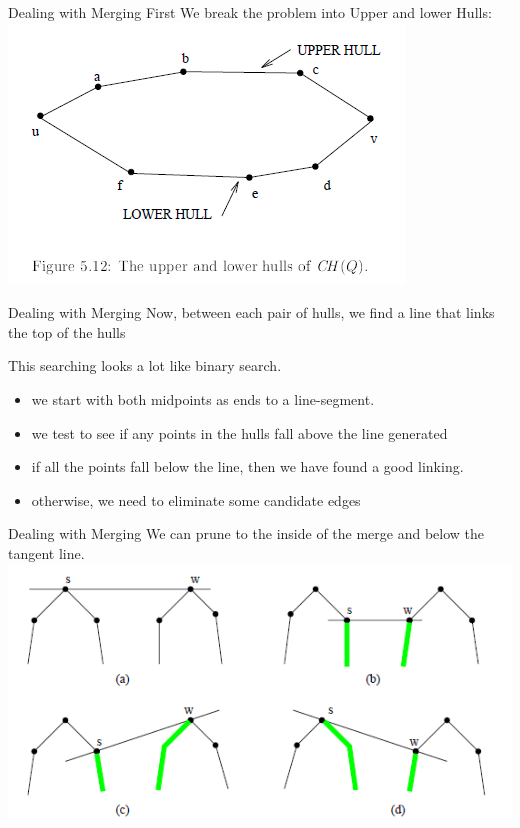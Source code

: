 \documentclass{beamer}
\begin{document}
\begin{frame}{Dealing with Merging}
First We break the problem into Upper and lower Hulls:
\includegraphics[width=\linewidth,center]{imgs/upper_lower_hull.png}

\end{frame}

\begin{frame}{Dealing with Merging}
Now, between each pair of hulls, we find a line that links the top of the hulls

This searching looks a lot like binary search.
		\begin{itemize}
			\item
				we start with both midpoints as ends to a line-segment.
			\item 
			    we test to see if any points in the hulls fall above the line generated
			\item
				if all the points fall below the line, then we have found a good linking.
			\item
			    otherwise, we need to eliminate some candidate edges
				
		\end{itemize}	

\end{frame}

\begin{frame}{Dealing with Merging}
	We can prune to the inside of the merge and below the tangent line.
		\includegraphics[width=\linewidth,center]{imgs/tangent_search.png}

\end{frame}
\end{document}
